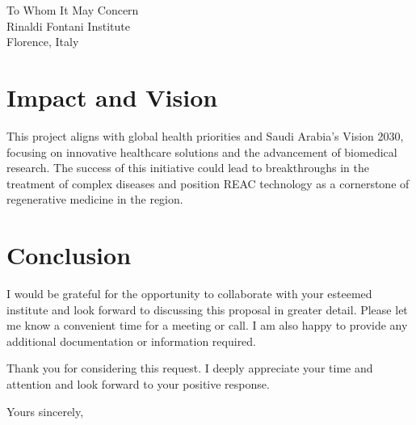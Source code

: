 \documentclass[a4paper,12pt]{letter}
\begin{document}
\begin{letter}{To Whom It May Concern \\ Rinaldi Fontani Institute \\ Florence, Italy}
\section*{Impact and Vision}
This project aligns with global health priorities and Saudi Arabia’s Vision 2030, focusing on innovative healthcare solutions and the advancement of biomedical research. The success of this initiative could lead to breakthroughs in the treatment of complex diseases and position REAC technology as a cornerstone of regenerative medicine in the region.

\section*{Conclusion}
I would be grateful for the opportunity to collaborate with your esteemed institute and look forward to discussing this proposal in greater detail. Please let me know a convenient time for a meeting or call. I am also happy to provide any additional documentation or information required.

Thank you for considering this request. I deeply appreciate your time and attention and look forward to your positive response.

\closing{Yours sincerely,}

\end{letter}
\end{document}
